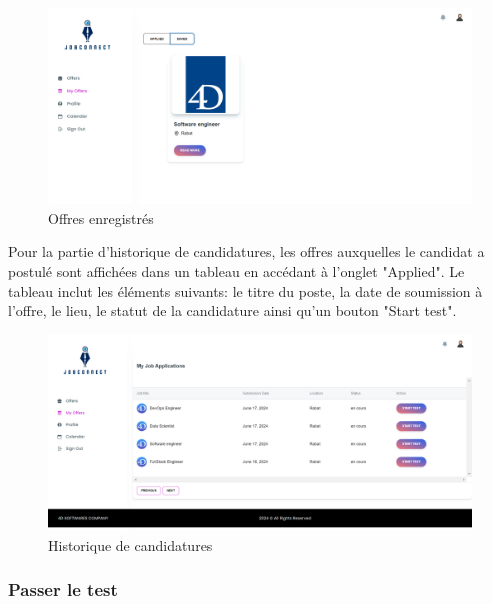 \begin{figure}[htbp]
   \centering
   \includegraphics[scale=0.2]{screens/saved.png} 
   \caption{Offres enregistrés}
   \label{fig:saved}
\end{figure}

Pour la partie d'historique de candidatures, les  offres auxquelles le  candidat a 
postulé sont affichées dans un tableau en accédant à l'onglet "Applied". Le tableau inclut les éléments suivants: le titre du poste, la date de  
soumission à l'offre, le  lieu, le  statut de la candidature ainsi qu'un bouton "Start test".  
\vspace{3cm}
\begin{figure}[htbp]
   \centering
   \includegraphics[scale=0.2]{screens/myofffers.png} 
   \caption{Historique de candidatures}
   \label{fig:candidatures}
\end{figure}




\subsubsection{Passer le test}

